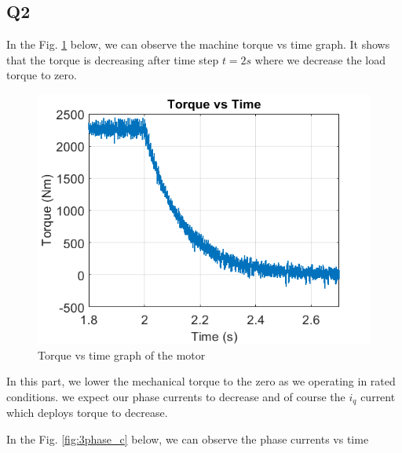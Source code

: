 \subsection{Q2}

In the Fig. \ref{fig:tl0_torque} below, we can observe the machine torque vs time graph. It shows that the torque is decreasing after time step $t=2s$ where we decrease the load torque to zero.

\begin{center}
\begin{figure}[H]
\centering
\includegraphics [width= 10 cm]{figs/TL0_torque.png}
\caption{Torque vs time graph of the motor}
\label{fig:tl0_torque}
\end{figure}
\end{center}

In this part, we lower the mechanical torque to the zero as we operating in rated conditions. we expect our phase currents to decrease and of course the $i_q$ current which deploys torque to decrease. 

In the Fig. \ref{fig:3phase_c} below, we can observe the phase currents vs time
        
